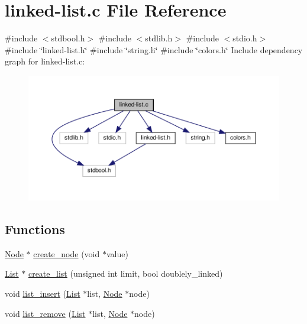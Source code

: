 \hypertarget{linked-list_8c}{}\section{linked-\/list.c File Reference}
\label{linked-list_8c}
{\ttfamily \#include $<$stdbool.\+h$>$}\newline
{\ttfamily \#include $<$stdlib.\+h$>$}\newline
{\ttfamily \#include $<$stdio.\+h$>$}\newline
{\ttfamily \#include \char`\"{}linked-\/list.\+h\char`\"{}}\newline
{\ttfamily \#include \char`\"{}string.\+h\char`\"{}}\newline
{\ttfamily \#include \char`\"{}colors.\+h\char`\"{}}\newline
Include dependency graph for linked-\/list.c\+:
\nopagebreak
\begin{figure}[H]
\begin{center}
\leavevmode
\includegraphics[width=350pt]{linked-list_8c__incl}
\end{center}
\end{figure}
\subsection*{Functions}
\begin{DoxyCompactItemize}
\item 
\hyperlink{structNode}{Node} $\ast$ \hyperlink{linked-list_8c_a45dfa9366701eddf667fd95d05cc3be0}{create\+\_\+node} (void $\ast$value)
\item 
\hyperlink{structList}{List} $\ast$ \hyperlink{linked-list_8c_abd16529dbe0922996788f10925823eea}{create\+\_\+list} (unsigned int limit, bool doublely\+\_\+linked)
\item 
void \hyperlink{linked-list_8c_a947069a28d8173531d9186a74e82fb62}{list\+\_\+insert} (\hyperlink{structList}{List} $\ast$list, \hyperlink{structNode}{Node} $\ast$node)
\item 
void \hyperlink{linked-list_8c_ad17dd6e2d3e64d3e9665f313ffb808a1}{list\+\_\+remove} (\hyperlink{structList}{List} $\ast$list, \hyperlink{structNode}{Node} $\ast$node)
\end{DoxyCompactItemize}


